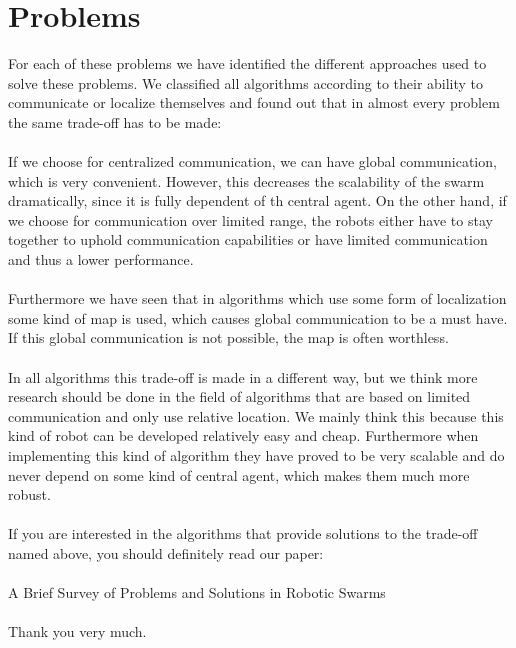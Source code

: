 \documentclass[a4paper]{article}
\begin{document}
\section*{Problems}
For each of these problems we have identified the different approaches used to solve these problems. We classified all algorithms according to their ability to communicate or localize themselves and found out that in almost every problem the same trade-off has to be made:\\
\\
If we choose for centralized communication, we can have global communication, which is very convenient. However, this decreases the scalability of the swarm dramatically, since it is fully dependent of th central agent. On the other hand, if we choose for communication over limited range, the robots either have to stay together to uphold communication capabilities or have limited communication and thus a lower performance.\\
\\
Furthermore we have seen that in algorithms which use some form of localization some kind of map is used, which causes global communication to be a must have. If this global communication is not possible, the map is often worthless.\\
\\
In all algorithms this trade-off is made in a different way, but we think more research should be done in the field of algorithms that are based on limited communication and only use relative location. We mainly think this because this kind of robot can be developed relatively easy and cheap. Furthermore when implementing this kind of algorithm they have proved to be very scalable and do never depend on some kind of central agent, which makes them much more robust.\\
\\
If you are interested in the algorithms that provide solutions to the trade-off named above, you should definitely read our paper:\\
\\
A Brief Survey of Problems and Solutions in Robotic Swarms\\
\\
Thank you very much.
\end{document}
